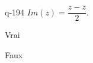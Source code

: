 \begin{truefalse}{q-194}
$Im(z)= \dfrac{z-\overline z}{2}$.
\item Vrai
\item* Faux
\end{truefalse}

